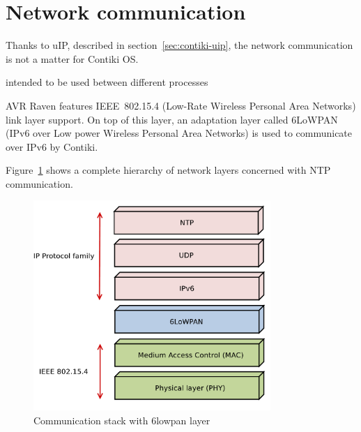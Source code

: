 
\section{Network communication}
Thanks to uIP, described in section~\ref{sec:contiki-uip},
the network communication is not a matter for Contiki OS.

intended to be used between different processes

AVR Raven features IEEE~802.15.4 (Low-Rate Wireless Personal Area Networks) link layer support.
On top of this layer, an adaptation layer called 6LoWPAN (IPv6 over Low power Wireless Personal Area Networks)
is used to communicate over IPv6 by Contiki.

Figure~\ref{fig:design-6lowpan} shows a complete hierarchy of network layers
concerned with NTP communication.
\begin{figure}
  \centering
  \includegraphics[width=9cm,keepaspectratio]{fig/6lowpan.pdf}
  \caption{Communication stack with 6lowpan layer}
  \label{fig:design-6lowpan}
  \bigskip
\end{figure}


